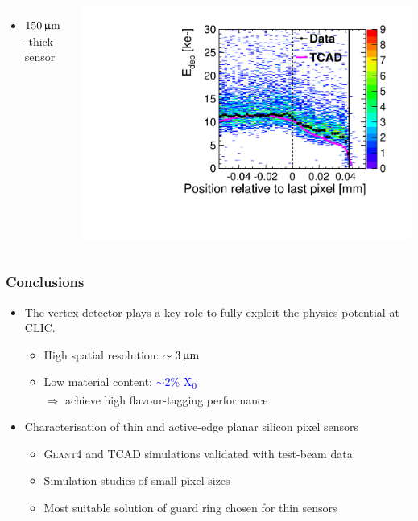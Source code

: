 \begin{frame}
\begin{columns}
    \begin{itemize}
    \item $150\,\upmu\mathrm{m}$-thick sensor
    \end{itemize}
    \centering
    \includegraphics[width=\textwidth]{../figures/ActiveEdge/55_GNDGR_150_Edep_TCAD_data.pdf}
  \end{columns}

\end{frame}

\label{lastslide}
\begin{frame}
  \frametitle{Conclusions}

  \begin{itemize}
  \item The vertex detector plays a key role to fully exploit the
    physics potential at CLIC.
    \begin{itemize}
    \item High spatial resolution: \textcolor{Blue}{$\sim3\,\upmu\mathrm{m}$}
    \item Low material content: \textcolor{Blue}{$\sim$2\%
        X\textsubscript{0}} \\
      $\Rightarrow$ achieve high flavour-tagging performance
    \end{itemize} 
    \item Characterisation of thin and active-edge planar silicon
      pixel sensors
      \begin{itemize}
      \item \textsc{Geant4} and TCAD simulations validated with
        test-beam data
      \item Simulation studies of small pixel sizes
      \item Most suitable solution of guard ring chosen for thin
        sensors
      \end{itemize}

  \end{itemize}

\end{frame}

